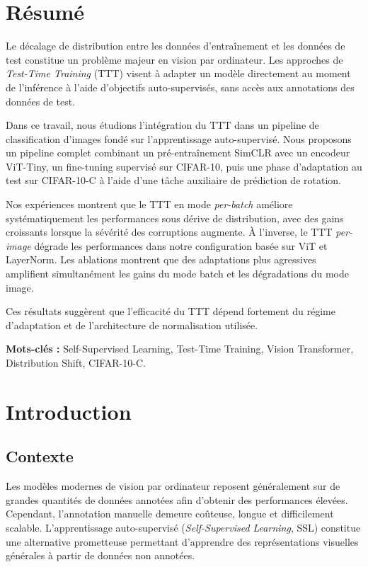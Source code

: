 \documentclass[12pt,a4paper]{report}
\begin{document}
	\chapter*{Résumé}
	
	Le décalage de distribution entre les données d'entraînement et les données de test constitue un problème majeur en vision par ordinateur. Les approches de \emph{Test-Time Training} (TTT) visent à adapter un modèle directement au moment de l'inférence à l'aide d'objectifs auto-supervisés, sans accès aux annotations des données de test.
	
	Dans ce travail, nous étudions l'intégration du TTT dans un pipeline de classification d'images fondé sur l'apprentissage auto-supervisé. Nous proposons un pipeline complet combinant un pré-entraînement SimCLR avec un encodeur ViT-Tiny, un fine-tuning supervisé sur CIFAR-10, puis une phase d'adaptation au test sur CIFAR-10-C à l'aide d'une tâche auxiliaire de prédiction de rotation.
	
	Nos expériences montrent que le TTT en mode \emph{per-batch} améliore systématiquement les performances sous dérive de distribution, avec des gains croissants lorsque la sévérité des corruptions augmente. À l'inverse, le TTT \emph{per-image} dégrade les performances dans notre configuration basée sur ViT et LayerNorm. Les ablations montrent que des adaptations plus agressives amplifient simultanément les gains du mode batch et les dégradations du mode image.
	
	Ces résultats suggèrent que l'efficacité du TTT dépend fortement du régime d'adaptation et de l'architecture de normalisation utilisée.
	\vspace{1em}
	
	\textbf{Mots-clés :}
	Self-Supervised Learning, Test-Time Training, Vision Transformer, Distribution Shift, CIFAR-10-C.
	
	\chapter{Introduction}
	
	\section{Contexte}
	Les modèles modernes de vision par ordinateur reposent généralement sur de grandes quantités de données annotées afin d'obtenir des performances élevées. Cependant, l’annotation manuelle demeure coûteuse, longue et difficilement scalable. L’apprentissage auto-supervisé (\emph{Self-Supervised Learning}, SSL) constitue une alternative prometteuse permettant d’apprendre des représentations visuelles générales à partir de données non annotées.
	
\end{document}
